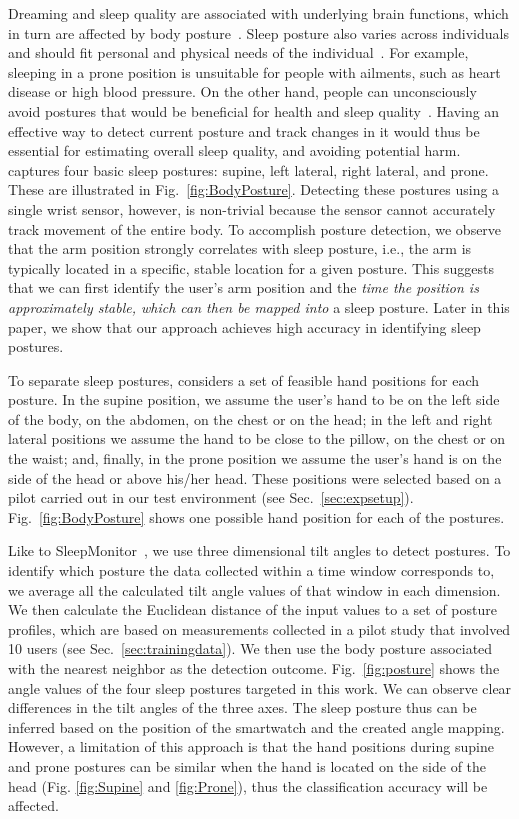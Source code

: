 Dreaming and sleep quality are associated with underlying brain functions, which in turn are affected by body posture~\cite{posture2004}. Sleep posture also varies across individuals and should fit personal and physical needs of the individual~\cite{posture2016,posture2017}. For example, sleeping in a prone position is unsuitable for people with ailments, such as heart disease or high blood pressure. On the other hand, people can {unconsciously} avoid postures that would be beneficial for health and sleep quality~\cite{posture2015}. Having an effective way to detect current posture and track changes in it would thus be essential for estimating overall sleep quality, and avoiding potential harm. {{\systemname} captures four basic sleep postures: supine, left lateral, right lateral, and prone. These are illustrated in} Fig.~\ref{fig:BodyPosture}. Detecting these postures using a single wrist sensor, however, is non-trivial because the sensor cannot accurately track movement of the entire body. To accomplish posture detection, we observe that the arm position strongly correlates {with} sleep posture, i.e., the arm is typically located in a specific, stable location for a given posture. This  suggests that we can first identify the user's arm position and the {\em time the position is approximately stable, which can then be mapped into} a sleep posture. Later in this paper, we show that our approach {achieves} high accuracy in identifying sleep postures.

To separate sleep postures, {\systemname} considers a set of feasible hand positions for each posture. {In the supine position, we assume the user's hand to be on the left side of the body, on the abdomen, on the chest or on the head; in the left and right lateral positions we assume the hand to be close to the pillow, on the chest or on the waist; and, finally, in the prone position we assume the user's hand is on the side of the head or above his/her head.} These positions were selected based on a pilot carried out in our test environment (see Sec.~\ref{sec:expsetup}). Fig.~\ref{fig:BodyPosture} shows one possible hand position for each of the postures.

Like to SleepMonitor~\cite{sleepmonitor}, we use {three dimensional tilt angles} to detect postures. To identify {which posture the data collected within a time window corresponds to}, we average all the calculated tilt angle values of that window in each dimension. We then calculate the Euclidean distance of the input values to a set of posture profiles, which are based on measurements collected in a pilot study that involved 10 users (see Sec.~\ref{sec:trainingdata}). We then use the body posture associated with the nearest neighbor as the detection outcome. Fig.~\ref{fig:posture} shows the angle values of the four sleep postures targeted in this work. {We can observe clear differences in the tilt angles of the three axes}. The sleep posture thus can be inferred based on the position of the smartwatch and the created angle mapping. However, a limitation of this approach is that the hand positions during supine and prone postures {can be} similar when the hand is located on the side of the head (Fig. \ref{fig:Supine} and \ref{fig:Prone}), thus the classification accuracy will be affected.

